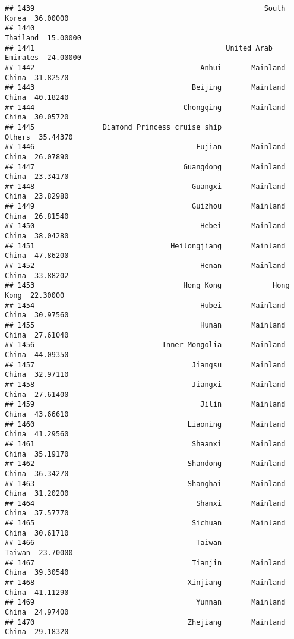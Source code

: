 \documentclass[
]{article}
\begin{document}
\begin{verbatim}
## 1439                                                      South Korea  36.00000
## 1440                                                         Thailand  15.00000
## 1441                                             United Arab Emirates  24.00000
## 1442                                       Anhui       Mainland China  31.82570
## 1443                                     Beijing       Mainland China  40.18240
## 1444                                   Chongqing       Mainland China  30.05720
## 1445                Diamond Princess cruise ship               Others  35.44370
## 1446                                      Fujian       Mainland China  26.07890
## 1447                                   Guangdong       Mainland China  23.34170
## 1448                                     Guangxi       Mainland China  23.82980
## 1449                                     Guizhou       Mainland China  26.81540
## 1450                                       Hebei       Mainland China  38.04280
## 1451                                Heilongjiang       Mainland China  47.86200
## 1452                                       Henan       Mainland China  33.88202
## 1453                                   Hong Kong            Hong Kong  22.30000
## 1454                                       Hubei       Mainland China  30.97560
## 1455                                       Hunan       Mainland China  27.61040
## 1456                              Inner Mongolia       Mainland China  44.09350
## 1457                                     Jiangsu       Mainland China  32.97110
## 1458                                     Jiangxi       Mainland China  27.61400
## 1459                                       Jilin       Mainland China  43.66610
## 1460                                    Liaoning       Mainland China  41.29560
## 1461                                     Shaanxi       Mainland China  35.19170
## 1462                                    Shandong       Mainland China  36.34270
## 1463                                    Shanghai       Mainland China  31.20200
## 1464                                      Shanxi       Mainland China  37.57770
## 1465                                     Sichuan       Mainland China  30.61710
## 1466                                      Taiwan               Taiwan  23.70000
## 1467                                     Tianjin       Mainland China  39.30540
## 1468                                    Xinjiang       Mainland China  41.11290
## 1469                                      Yunnan       Mainland China  24.97400
## 1470                                    Zhejiang       Mainland China  29.18320

\end{verbatim}
\end{document}
